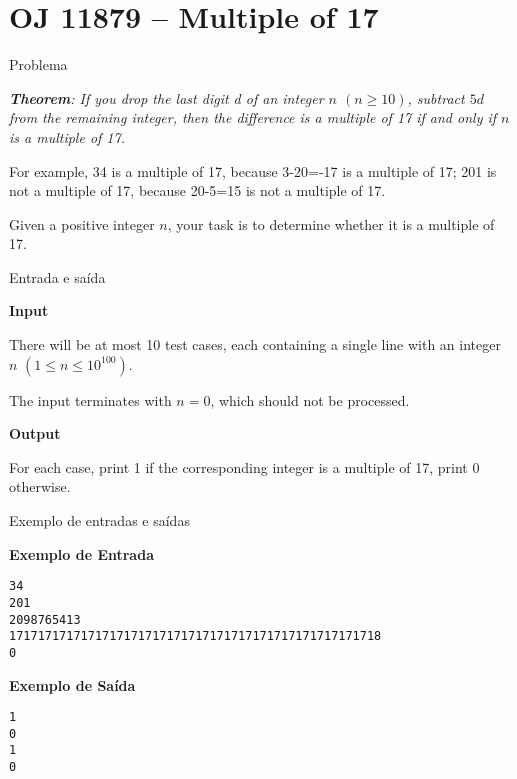 \section{OJ 11879 -- Multiple of 17}

\begin{frame}[fragile]{Problema}

\begin{center}
\textit{\textbf{Theorem}: If you drop the last digit d of an integer $n$ $(n \geq 10)$, subtract $5d$ from the remaining integer, then the difference is a multiple of 17 if and only if $n$ is a multiple of 17.}
\end{center}

For example, 34 is a multiple of 17, because 3-20=-17 is a multiple of 17; 201 is not a multiple of
17, because 20-5=15 is not a multiple of 17.

Given a positive integer $n$, your task is to determine whether it is a multiple of 17.

\end{frame}

\begin{frame}[fragile]{Entrada e saída}

\textbf{Input}

There will be at most 10 test cases, each containing a single line with an integer $n$ $(1 \leq n \leq 10^{100})$.

The input terminates with $n = 0$, which should not be processed.

\vspace{0.1in}

\textbf{Output}

For each case, print 1 if the corresponding integer is a multiple of 17, print 0 otherwise.

\end{frame}

\begin{frame}[fragile]{Exemplo de entradas e saídas}

\textbf{Exemplo de Entrada}
\begin{verbatim}
34
201
2098765413
1717171717171717171717171717171717171717171717171718
0
\end{verbatim}

\textbf{Exemplo de Saída}
\begin{verbatim}
1
0
1
0
\end{verbatim}
\end{frame}

